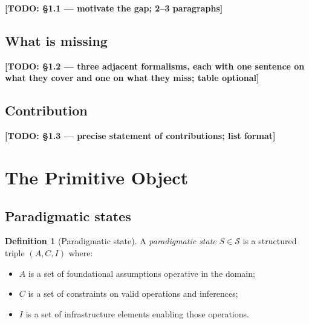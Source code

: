 \documentclass[11pt, a4paper]{article}
\theoremstyle{plain}
\theoremstyle{definition}
\newtheorem{definition}[theorem]{Definition}
\theoremstyle{remark}
\newcommand{\States}{\mathcal{S}}              %
\begin{document}
\textbf{[TODO: \S1.1 — motivate the gap; 2--3 paragraphs]}

\subsection{What is missing}
%

\textbf{[TODO: \S1.2 — three adjacent formalisms, each with one sentence on
what they cover and one on what they miss; table optional]}

\subsection{Contribution}

\textbf{[TODO: \S1.3 — precise statement of contributions; list format]}

\section{The Primitive Object}
\label{sec:primitive}

\subsection{Paradigmatic states}

\begin{definition}[Paradigmatic state]
\label{def:state}
A \emph{paradigmatic state} $S \in \States$ is a structured triple
$(A, C, I)$ where:
\begin{itemize}[itemsep=2pt]
  \item $A$ is a set of foundational assumptions operative in the domain;
  \item $C$ is a set of constraints on valid operations and inferences;
  \item $I$ is a set of infrastructure elements enabling those operations.
\end{itemize}
\end{definition}
\end{document}
